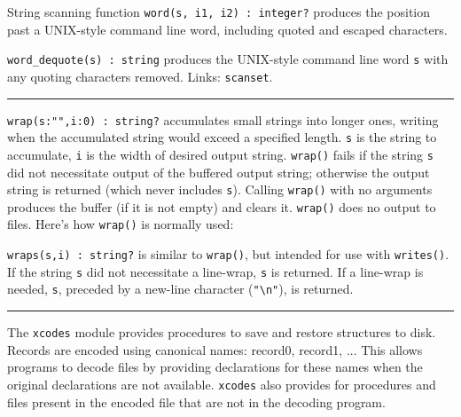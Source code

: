 String scanning function \texttt{word(s, i1, i2) : integer?} produces
the position past a UNIX-style command line word, including quoted and
escaped characters.

\texttt{word\_dequote(s) : string} produces the UNIX-style command line
word \texttt{s} with any quoting characters removed.
Links: \texttt{scanset}.

\vspace{0.25cm}\hrule{}

\texttt{wrap}\texttt{(s:"",i:0)
: string?} accumulates small strings into longer ones,
writing when the accumulated string would exceed a
specified length.
\texttt{s} is the string to accumulate, \texttt{i} is the width of
desired output string. \texttt{wrap()} fails if the string \texttt{s}
did not necessitate output of the buffered output string; otherwise the
output string is returned (which never includes \texttt{s}). Calling
\texttt{wrap()} with no arguments produces the buffer (if it is not
empty) and clears it. \texttt{wrap()} does no output to files.
Here's how \texttt{wrap()} is normally used:


\texttt{wraps(s,i) : string?} is similar to \texttt{wrap()}, but
intended for use with \texttt{writes()}. If the string \texttt{s} did
not necessitate a line-wrap, \texttt{s} is returned. If a line-wrap is
needed, \texttt{s}, preceded by a new-line character
(\texttt{"{\textbackslash}n"}), is
returned.

\vspace{0.25cm}\hrule{}

The \texttt{xcodes} module provides procedures to save
and restore structures to disk. Records are encoded
using canonical names: record0, record1, ... This allows
programs to decode files by providing declarations for these names when
the original declarations are not available. \texttt{xcodes} also
provides for procedures and files present in the encoded file that are
not in the decoding program.

